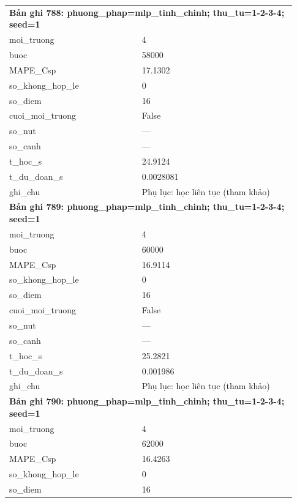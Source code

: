 \begin{longtable}{p{0.43\linewidth}p{0.50\linewidth}}
\midrule
\multicolumn{2}{p{0.95\linewidth}}{\textbf{Bản ghi 788: phuong\_phap=mlp\_tinh\_chinh; thu\_tu=1-2-3-4; seed=1}} \\
moi\_\allowbreak truong & 4 \\
buoc & 58000 \\
MAPE\_\allowbreak Csp & 17.1302 \\
so\_\allowbreak khong\_\allowbreak hop\_\allowbreak le & 0 \\
so\_\allowbreak diem & 16 \\
cuoi\_\allowbreak moi\_\allowbreak truong & False \\
so\_\allowbreak nut & — \\
so\_\allowbreak canh & — \\
t\_\allowbreak hoc\_\allowbreak s & 24.9124 \\
t\_\allowbreak du\_\allowbreak doan\_\allowbreak s & 0.0028081 \\
ghi\_\allowbreak chu & Phụ lục: học liên tục (tham khảo) \\
\midrule
\multicolumn{2}{p{0.95\linewidth}}{\textbf{Bản ghi 789: phuong\_phap=mlp\_tinh\_chinh; thu\_tu=1-2-3-4; seed=1}} \\
moi\_\allowbreak truong & 4 \\
buoc & 60000 \\
MAPE\_\allowbreak Csp & 16.9114 \\
so\_\allowbreak khong\_\allowbreak hop\_\allowbreak le & 0 \\
so\_\allowbreak diem & 16 \\
cuoi\_\allowbreak moi\_\allowbreak truong & False \\
so\_\allowbreak nut & — \\
so\_\allowbreak canh & — \\
t\_\allowbreak hoc\_\allowbreak s & 25.2821 \\
t\_\allowbreak du\_\allowbreak doan\_\allowbreak s & 0.001986 \\
ghi\_\allowbreak chu & Phụ lục: học liên tục (tham khảo) \\
\midrule
\multicolumn{2}{p{0.95\linewidth}}{\textbf{Bản ghi 790: phuong\_phap=mlp\_tinh\_chinh; thu\_tu=1-2-3-4; seed=1}} \\
moi\_\allowbreak truong & 4 \\
buoc & 62000 \\
MAPE\_\allowbreak Csp & 16.4263 \\
so\_\allowbreak khong\_\allowbreak hop\_\allowbreak le & 0 \\
so\_\allowbreak diem & 16 \\

\end{longtable}
